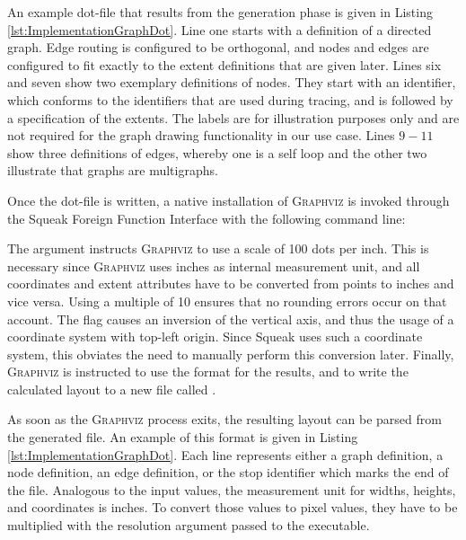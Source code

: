 An example dot-file that results from the generation phase is given in Listing \ref{lst:ImplementationGraphDot}.
Line one starts with a definition of a directed graph.
Edge routing is configured to be orthogonal, and nodes and edges are configured to fit exactly to the extent definitions that are given later.
Lines six and seven show two exemplary definitions of nodes.
They start with an identifier, which conforms to the identifiers that are used during tracing, and is followed by a specification of the extents.
The labels are for illustration purposes only and are not required for the graph drawing functionality in our use case.
Lines $9-11$ show three definitions of edges, whereby one is a self loop and the other two illustrate that graphs are multigraphs.

Once the dot-file is written, a native installation of \textsc{Graphviz} is invoked through the Squeak Foreign Function Interface with the following command line:
\begin{center}
\end{center}
The  argument instructs \textsc{Graphviz} to use a scale of 100 dots per inch.
This is necessary since \textsc{Graphviz} uses inches as internal measurement unit, and all coordinates and extent attributes have to be converted from points to inches and vice versa.
Using a multiple of 10 ensures that no rounding errors occur on that account.
The  flag causes an inversion of the vertical axis, and thus the usage of a coordinate system with top-left origin.
Since Squeak uses such a coordinate system, this obviates the need to manually perform this conversion later.
Finally, \textsc{Graphviz} is instructed to use the  format for the results, and to write the calculated layout to a new file called .

As soon as the \textsc{Graphviz} process exits, the resulting layout can be parsed from the generated file.
An example of this  format is given in Listing \ref{lst:ImplementationGraphDot}.
Each line represents either a graph definition, a node definition, an edge definition, or the stop identifier which marks the end of the file.
Analogous to the input values, the measurement unit for widths, heights, and coordinates is inches.
To convert those values to pixel values, they have to be multiplied with the resolution argument passed to the  executable.

